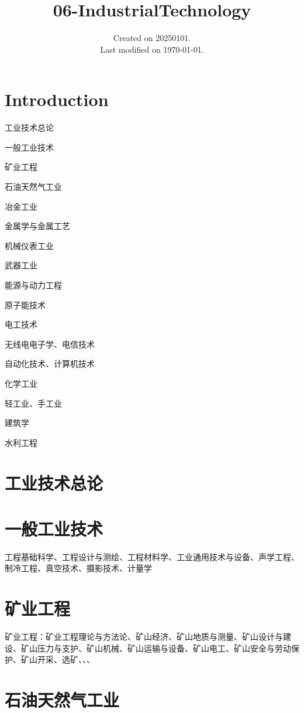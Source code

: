 \documentclass[UTF8]{../ApplicationUniverse}
\begin{document}
\title{06-IndustrialTechnology}
\date{Created on 20250101.\\   Last modified on \today.}
\maketitle
\tableofcontents


\chapter{Introduction}

工业技术总论

一般工业技术

矿业工程

石油天然气工业

冶金工业

金属学与金属工艺

机械仪表工业

武器工业

能源与动力工程

原子能技术

电工技术

无线电电子学、电信技术

自动化技术、计算机技术

化学工业

轻工业、手工业

建筑学

水利工程

\chapter{工业技术总论}%
\chapter{一般工业技术}%
工程基础科学、工程设计与测绘、工程材料学、工业通用技术与设备、声学工程、制冷工程、真空技术、摄影技术、计量学


\chapter{矿业工程}%
矿业工程：矿业工程理论与方法论、矿山经济、矿山地质与测量、矿山设计与建设、矿山压力与支护、矿山机械、矿山运输与设备、矿山电工、矿山安全与劳动保护、矿山开采、选矿、、、



\chapter{石油天然气工业}%
\end{document}
